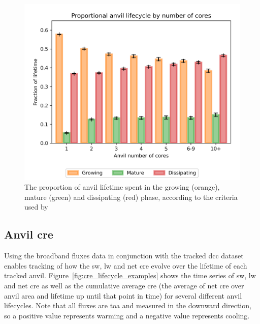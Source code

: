 \begin{figure}[tp]
    \includegraphics[width=\textwidth]{figures/chapter4_12.png}
    \caption[
    The proportion of anvil lifetime spent in the growing, mature and dissipating phase
    ]{
    The proportion of anvil lifetime spent in the growing (orange), mature (green) and dissipating (red) phase, according to the criteria used by \citet{futyan_deep_2007}
    }
    \label{fig:seviri_lifetime_proportions}
\end{figure}


\subsection{Anvil \acrshort{cre}}

Using the broadband fluxes data in conjunction with the tracked \acrshort{dcc} dataset enables tracking of how the \acrshort{sw}, \acrshort{lw} and net \acrshort{cre} evolve over the lifetime of each tracked anvil.
Figure~\ref{fig:cre_lifecycle_examples} shows the time series of \acrshort{sw}, \acrshort{lw} and net \acrshort{cre} as well as the cumulative average \acrshort{cre} (the average of net \acrshort{cre} over anvil area and lifetime up until that point in time) for several different anvil lifecycles.
Note that all fluxes are \acrshort{toa} and measured in the downward direction, so a positive value represents warming and a negative value represents cooling.



